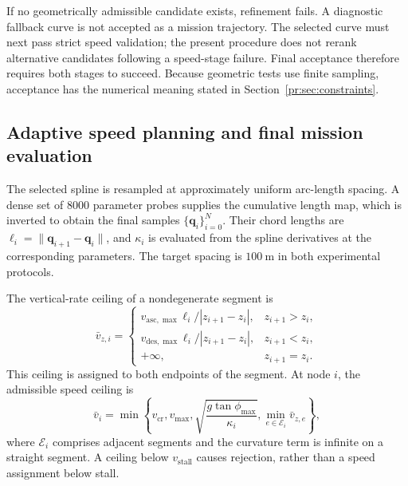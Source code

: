 If no geometrically admissible candidate exists, refinement fails. A
diagnostic fallback curve is not accepted as a mission trajectory. The
selected curve must next pass strict speed validation; the present
procedure does not rerank alternative candidates following a speed-stage
failure. Final acceptance therefore requires both stages to succeed.
Because geometric tests use finite sampling, acceptance has the numerical
meaning stated in Section~\ref{pr:sec:constraints}.

\subsection{Adaptive speed planning and final mission evaluation}
\label{sec:speed}

The selected spline is resampled at approximately uniform arc-length
spacing. A dense set of 8000 parameter probes supplies the cumulative
length map, which is inverted to obtain the final samples
$\{\mathbf q_i\}_{i=0}^{N}$. Their chord lengths are
$\ell_i=\|\mathbf q_{i+1}-\mathbf q_i\|$, and $\kappa_i$ is evaluated
from the spline derivatives at the corresponding parameters. The target
spacing is $100~\mathrm{m}$ in both experimental protocols.

The vertical-rate ceiling of a nondegenerate segment is
\begin{equation}
 \bar v_{z,i}=\begin{cases}
 v_{\mathrm{asc},\max}\ell_i/|z_{i+1}-z_i|,&z_{i+1}>z_i,\\
 v_{\mathrm{des},\max}\ell_i/|z_{i+1}-z_i|,&z_{i+1}<z_i,\\
 +\infty,&z_{i+1}=z_i.
 \end{cases}
 \label{me:eq:verticalcap}
\end{equation}
This ceiling is assigned to both endpoints of the segment. At node $i$,
the admissible speed ceiling is
\begin{equation}
 \bar v_i=\min\left\{
 v_{\mathrm{cr}},v_{\max},
 \sqrt{\frac{g\tan\phi_{\max}}{\kappa_i}},
 \min_{e\in\mathcal E_i}\bar v_{z,e}\right\},
 \label{me:eq:nodecap}
\end{equation}
where $\mathcal E_i$ comprises adjacent segments and the curvature term is
infinite on a straight segment. A ceiling below $v_{\mathrm{stall}}$
causes rejection, rather than a speed assignment below stall.


